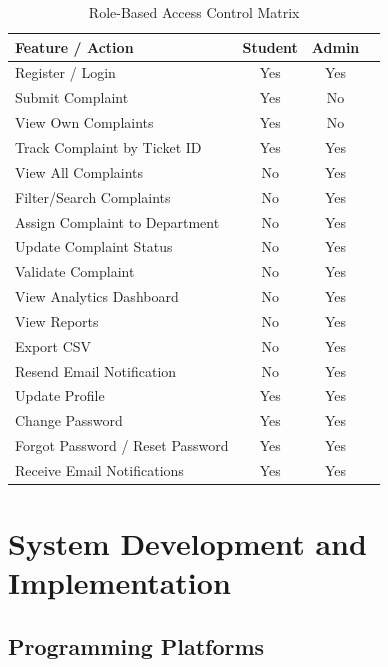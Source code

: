 \documentclass[12pt,a4paper]{report}
\begin{document}
\begin{table}[H]
\centering
\caption{Role-Based Access Control Matrix}
\begin{tabular}{p{6cm}ccc}
\toprule
\textbf{Feature / Action} & \textbf{Student} & \textbf{Admin} \\
\midrule
Register / Login & Yes & Yes \\
Submit Complaint & Yes & No \\
View Own Complaints & Yes & No \\
Track Complaint by Ticket ID & Yes & Yes \\
View All Complaints & No & Yes \\
Filter/Search Complaints & No & Yes \\
Assign Complaint to Department & No & Yes \\
Update Complaint Status & No & Yes \\
Validate Complaint & No & Yes \\
View Analytics Dashboard & No & Yes \\
View Reports & No & Yes \\
Export CSV & No & Yes \\
Resend Email Notification & No & Yes \\
Update Profile & Yes & Yes \\
Change Password & Yes & Yes \\
Forgot Password / Reset Password & Yes & Yes \\
Receive Email Notifications & Yes & Yes \\
\bottomrule
\end{tabular}
\end{table}

\chapter{System Development and Implementation}

\section{Programming Platforms}
\end{document}
